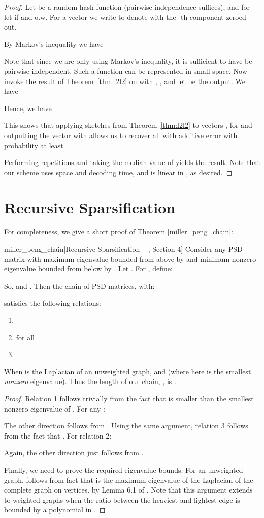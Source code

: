 \documentclass[11pt]{article}
\begin{document}
\begin{proof}
Let  be a random hash function (pairwise independence suffices), and  for  let  if  and  o.w. 
For a vector  we write  to denote  with the -th component zeroed out. 

By Markov's inequality we have

Note that since we are only using Markov's inequality, it is sufficient to have  be pairwise independent. Such a function  can be represented in small space.
Now invoke the result of Theorem~\ref{thm:l2l2} on  with , , and let  be the output. We have 

Hence, we have


This shows that applying sketches from Theorem~\ref{thm:l2l2} to vectors , for  and outputting the vector  with  allows us to recover all  with  additive error with probability at least .

Performing  repetitions and taking the median value of  yields the result. 
Note that our scheme uses  space and decoding time, and is linear in , as desired.
\end{proof}

\section{Recursive Sparsification}\label{miller_peng_appendix}
For completeness, we give a short proof of Theorem \ref{miller_peng_chain}:
\begin{reptheorem}{miller_peng_chain}[Recursive Sparsification -- \cite{pengV1}, Section 4]
Consider any PSD matrix  with maximum eigenvalue bounded from above by  and minimum nonzero eigenvalue bounded from below by . Let .  For , define:

So,  and . Then the chain of PSD matrices,  with:

satisfies the following relations:
\begin{enumerate}
  \item 
  \item  for all 
  \item 
\end{enumerate}
When  is the Laplacian of an unweighted graph,  and  (where here  is the smallest \emph{nonzero} eigenvalue). Thus the length of our chain, , is .
\end{reptheorem}

\begin{proof}
Relation 1 follows trivially from the fact that  is smaller than the smallest nonzero eigenvalue of . For any :
  
The other direction follows from . Using the same argument, relation 3 follows from the fact that . For relation 2:

Again, the other direction just follows from  . 

Finally, we need to prove the required eigenvalue bounds. For an unweighted graph,  follows from fact that  is the maximum eigenvalue of the Laplacian of the complete graph on  vertices.  by Lemma 6.1 of \cite{spielmanTengSolver}.
Note that this argument extends to weighted graphs when the ratio between the heaviest and lightest edge is bounded by a polynomial in .
\end{proof}



 
\end{document}
